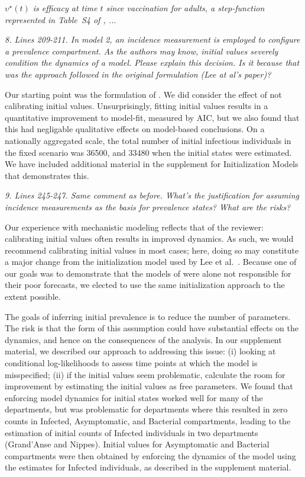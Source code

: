\documentclass[11pt]{article}
\newcommand\report[1]{{\color{mygreen} \vspace{1mm}\hspace{0.25in}\parbox{6in}{\em #1}}}
\newcommand\article[1]{{\color{blue} \vspace{1mm}\hspace{0.25in}\parbox{6in}{\em #1}}}
\begin{document}
\article{$\upsilon^\star(t)$ is efficacy at time $t$ since vaccination for adults, a step-function represented in Table~S4 of \cite{lee20}, ...}

\report{
  8. Lines 209-211. In model 2, an incidence measurement is employed to configure a prevalence compartment. As the authors may know, initial values severely condition the dynamics of a model. Please explain this decision. Is it because that was the approach followed in the original formulation (Lee at al's paper)?
}

Our starting point was the formulation of \cite{lee20}.
We did consider the effect of not calibrating initial values.
Unsurprisingly, fitting initial values results in a quantitative improvement to model-fit, measured by AIC, but we also found that this had negligable qualitative effects on model-based conclusions.
On a nationally aggregated scale, the total number of initial infectious individuals in the fixed scenario was 36500, and 33480 when the initial states were estimated.
We have included additional material in the supplement for Initialization Models that demonstrates this. %

\report{
  9. Lines 245-247. Same comment as before. What’s the justification for assuming incidence measurements as the basis for prevalence states? What are the risks?
}

Our experience with mechanistic modeling reflects that of the reviewer: calibrating initial values often results in improved dynamics.
As such, we would recommend calibrating initial values in most cases; here, doing so may constitute a major change from the initialization model used by Lee et al.~\cite{lee20}.
Because one of our goals was to demonstrate that the models of \cite{lee20} were alone not responsible for their poor forecasts, we elected to use the same initialization approach to the extent possible.

The goals of inferring initial prevalence is to reduce the number of parameters.
The risk is that the form of this assumption could have substantial effects on the dynamics, and hence on the consequences of the analysis.
In our supplement material, we described our approach to addressing this issue: (i) looking at conditional log-likelihoods to assess time points at which the model is misspecified; (ii) if the initial values seem problematic, calculate the room for improvement by estimating the initial values as free parameters.
We found that enforcing model dynamics for initial states worked well for many of the departments, but was problematic for departments where this resulted in zero counts in Infected, Asymptomatic, and Bacterial compartments, leading to the estimation of initial counts of Infected individuals in two departments (Grand'Anse and Nippes). Initial values for Asymptomatic and Bacterial compartments were then obtained by enforcing the dynamics of the model using the estimates for Infected individuals, as described in the supplement material.
\end{document}
